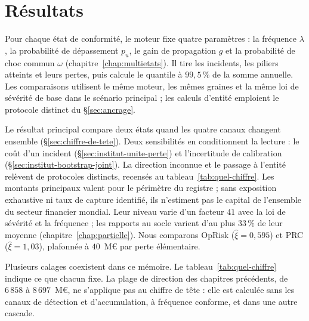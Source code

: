 ﻿%

\chapter{Résultats}
\label{chap:resultats}
\label{part:resultats}

Pour chaque état de conformité, le moteur fixe quatre paramètres : la fréquence $\lambda$, la probabilité de dépassement
$p_u$, le gain de propagation $g$ et la probabilité de choc commun $\omega$
(chapitre~\ref{chap:multietats}). Il tire les incidents, les piliers atteints et leurs pertes,
puis calcule le quantile à $99{,}5\,\%$ de la somme annuelle. Les comparaisons utilisent le même
moteur, les mêmes graines et la même loi de sévérité de base dans le scénario principal ; les
calculs d'entité emploient le protocole distinct du \S\ref{sec:ancrage}.

Le résultat principal compare deux états quand les quatre canaux changent ensemble
(\S\ref{sec:chiffre-de-tete}). Deux sensibilités en conditionnent la lecture : le coût d'un
incident (\S\ref{sec:institut-unite-perte}) et l'incertitude de calibration
(\S\ref{sec:institut-bootstrap-joint}). La direction inconnue et le passage à l'entité
relèvent de protocoles distincts, recensés au tableau~\ref{tab:quel-chiffre}.
Les montants principaux valent pour le périmètre du registre ; sans exposition
exhaustive ni taux de capture identifié, ils n'estiment pas le capital de l'ensemble du secteur financier mondial.
Leur niveau varie d'un facteur $41$ avec la loi de sévérité et la fréquence ;
les rapports au socle varient d'au plus $33\,\%$ de leur moyenne (chapitre~\ref{chap:partielle}).
Nous comparons OpRisk ($\hat\xi=0{,}595$)
et PRC ($\hat\xi=1{,}03$), plafonnée à $40$~M\euro{} par perte élémentaire.

Plusieurs calages coexistent dans ce mémoire. Le tableau~\ref{tab:quel-chiffre} indique ce que chacun fixe. La plage de direction des chapitres précédents, de $6\,858$ à $8\,697$~M\euro, ne s'applique pas au chiffre de tête : elle est calculée sans les canaux de détection et d'accumulation, à fréquence conforme, et dans une autre cascade.

